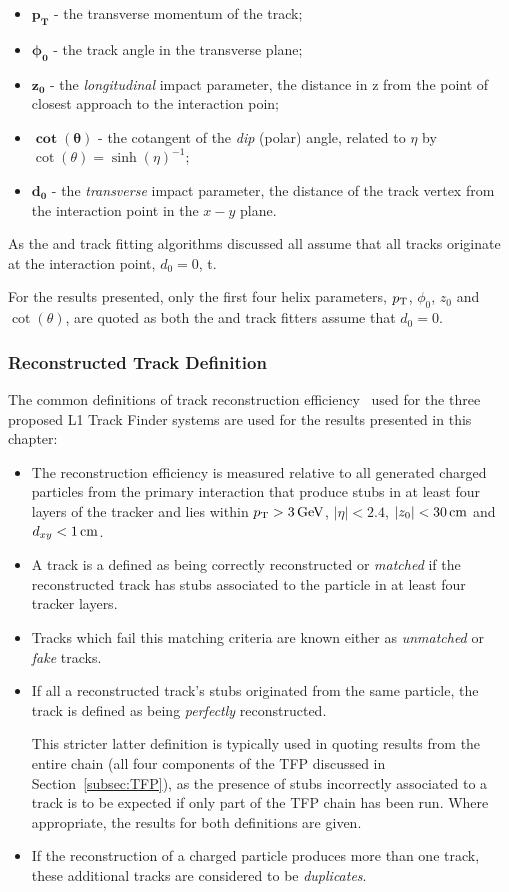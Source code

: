 \begin{itemize}
\item $\mathbf{p_{T}}$ - the transverse momentum of the track;
\item $\mathbf{\phi_{0}}$ - the track angle in the transverse plane;
\item $\mathbf{z_{0}}$ - the \emph{longitudinal} impact parameter, \ie the distance in z from the point of closest approach to the interaction poin;
\item $\mathbf{\cot(\theta)}$ - the cotangent of the \emph{dip} (polar) angle, related to $\eta$ by $\cot(\theta) = \sinh (\eta)^{-1}$;
\item $\mathbf{d_{0}}$ - the \emph{transverse} impact parameter, \ie the distance of the track vertex from the interaction point in the $x-y$ plane. 
\end{itemize}

As the \HT and track fitting algorithms discussed all assume that all tracks originate at the interaction point, \ie $d_{0} = 0$, t.

For the results presented, only the first four helix parameters, $p_{\mathrm{T}}$, $\phi_{0}$, $z_{0}$ and $\cot(\theta)$, are quoted as both the \HT and track fitters assume that $d_{0} = 0$.

\subsubsection{Reconstructed Track Definition}
The common definitions of track reconstruction efficiency~\cite{TMTT_JINST} used for the three proposed L1 Track Finder systems are used for the results presented in this chapter:

\begin{itemize}
\item The reconstruction efficiency is measured relative to all generated charged particles from the primary interaction that produce stubs in at least four layers of the tracker and lies within $p_{\mathrm{T}} > 3\,\text{Ge\hspace{-.08em}V}$, $|\eta| < 2.4$, $|z_{0}| < 30\,\text{cm}$ and $d_{xy} < 1\,\text{cm}$.
\item A track is a defined as being correctly reconstructed or \emph{matched} if the reconstructed track has stubs associated to the particle in at least four tracker layers.
\item Tracks which fail this matching criteria are known either as \emph{unmatched} or \emph{fake} tracks.
\item If all a reconstructed track's stubs originated from the same particle, the track is defined as being \emph{perfectly} reconstructed. 

This stricter latter definition is typically used in quoting results from the entire chain (\ie all four components of the TFP discussed in Section~\ref{subsec:TFP}), as the presence of stubs incorrectly associated to a track is to be expected if only part of the TFP chain has been run.
Where appropriate, the results for both definitions are given.
\item If the reconstruction of a charged particle produces more than one track, these additional tracks are considered to be \emph{duplicates}.
\end{itemize}


